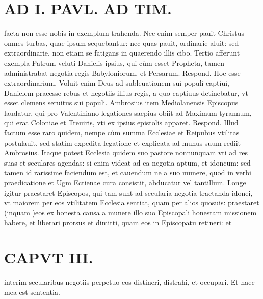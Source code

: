 \documentclass{article}
\begin{document}
\begin{pages}
\section*{AD I. PAVL. AD TIM. }
\marginpar{[ p.154 ]}\pstart facta non esse nobis in exemplum trahenda. Nec enim semper pauit Christus omnes turbas, quae ipsum sequebantur: nec quas pauit, ordinarie aluit: sed extraordinarie, non etiam se fatigans in quaerendo illis cibo.  \pend\pstart Tertio afferunt exempla Patrum veluti Danielis ipsius, qui cùm esset Propheta, tamen administrabat negotia regis Babyloniorum, et Persarum. Respond. Hoc esse extraordinarium. Voluit enim Deus ad subleuationem sui populi captiui, Danielem praeesse rebus et negotiis illius regis, a quo captiuus detinebatur, vt esset clemens seruitus sui populi. Ambrosius item Mediolanensis Episcopus laudatur, qui pro Valentiniano legationes saepius obiit ad Maximum tyrannum, qui erat Coloniae et Treuiris, vti ex ipsius epistolis apparet. Respond. Illud factum esse raro quidem, nempe cùm summa Ecclesiae et Reipubus  vtilitas postulauit, sed statim expedita legatione et explicata ad munus suum rediit Ambrosius. Itaque potest Ecclesia quidem suo pastore nonnunquam vti ad res suas et seculares agendas: si enim videat ad ea negotia aptum, et idoncum: sed tamen id rarissime faciendum est, et cauendum ne a suo munere, quod in verbi praedicatione et Ugm Ectienae cura consistit, abducatur vel tantillum. Longe igitur praestaret Episcopos, qui tam sunt ad secularia negotia tractanda idonei, vt maiorem per eos vtilitatem Ecclesia sentiat, quam per alios quosuis: praestaret (inquam )eos ex honesta causa a munere illo suo Episcopali honestam missionem habere, et liberari prorsus et dimitti, quam eos in Episcopatu retineri: et  \pend
\section*{CAPVT  III. }
\marginpar{[ p.153 ]}\pstart interim secularibus negotiis perpetuo eos distineri, distrahi, et occupari. Et haec mea est sententia.  \pend
{}
{}

\end{pages}
\end{document}
